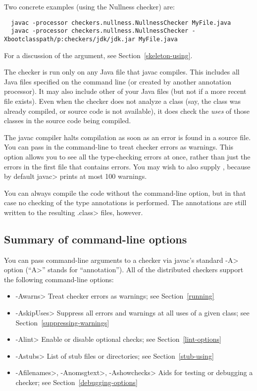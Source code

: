 Two concrete examples (using the Nullness checker) are:

\begin{smaller}
\begin{Verbatim}
  javac -processor checkers.nullness.NullnessChecker MyFile.java
  javac -processor checkers.nullness.NullnessChecker -Xbootclasspath/p:checkers/jdk/jdk.jar MyFile.java
\end{Verbatim}
\end{smaller}

\noindent
For a discussion of the  argument, see
Section~\ref{skeleton-using}.

The checker is run only on any Java file that javac compiles.
This includes all Java files specified on the command line (or
created by another annotation processor).  It may also include other of
your Java files (but not if a more recent  file exists).
Even when the checker does not analyze a class (say, the class was
already compiled, or source code is not available), it does check
the \emph{uses} of those classes in the source code being compiled.

The javac compiler halts compilation as soon as an error is found in a
source file.  You can pass  in the command-line to
treat checker errors as warnings.  This option allows you to see all
the type-checking errors at once, rather than just the errors in the first
file that contains errors.  You may wish to also supply
, because by default \<javac> prints at most 100
warnings.

You can always compile the code without the 
command-line option, but in that case no checking of the type
annotations is performed.  The annotations are still written to the
resulting \<.class> files, however.



\subsection{Summary of command-line options\label{checker-options}}

You can pass command-line arguments to a checker via javac's standard \<-A>
option (``\<A>'' stands for ``annotation'').  All of the distributed
checkers support the following command-line options:

\begin{itemize}
\item \<-Awarns> Treat checker errors as warnings; see Section~\ref{running}
\item \<-AskipUses> Suppress all errors and warnings at all uses of a
  given class; see Section~\ref{suppressing-warnings}
\item \<-Alint> Enable or disable optional checks; see Section~\ref{lint-options}
\item \<-Astubs> List of stub files or directories; see Section~\ref{stub-using}
\item \<-Afilenames>, \<-Anomsgtext>, \<-Ashowchecks> Aids for testing or debugging a checker; see Section~\ref{debugging-options}
\end{itemize}

